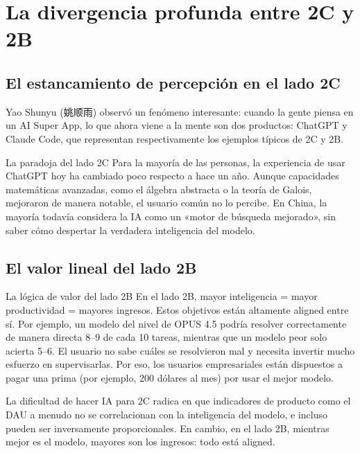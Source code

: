 \section{La divergencia profunda entre 2C y 2B}

\subsection{El estancamiento de percepción en el lado 2C}

Yao Shunyu (姚顺雨) observó un fenómeno interesante: cuando la gente piensa en un AI Super App, lo que ahora viene a la mente son dos productos: ChatGPT y Claude Code, que representan respectivamente los ejemplos típicos de 2C y 2B.

\begin{warningbox}{La paradoja del lado 2C}
Para la mayoría de las personas, la experiencia de usar ChatGPT hoy ha cambiado poco respecto a hace un año. Aunque capacidades matemáticas avanzadas, como el álgebra abstracta o la teoría de Galois, mejoraron de manera notable, el usuario común no lo percibe. En China, la mayoría todavía considera la IA como un «motor de búsqueda mejorado», sin saber cómo despertar la verdadera inteligencia del modelo.
\end{warningbox}

\subsection{El valor lineal del lado 2B}

\begin{importantbox}{La lógica de valor del lado 2B}
En el lado 2B, mayor inteligencia = mayor productividad = mayores ingresos. Estos objetivos están altamente aligned entre sí. Por ejemplo, un modelo del nivel de OPUS 4.5 podría resolver correctamente de manera directa 8--9 de cada 10 tareas, mientras que un modelo peor solo acierta 5--6. El usuario no sabe cuáles se resolvieron mal y necesita invertir mucho esfuerzo en supervisarlas. Por eso, los usuarios empresariales están dispuestos a pagar una prima (por ejemplo, 200 dólares al mes) por usar el mejor modelo.
\end{importantbox}

La dificultad de hacer IA para 2C radica en que indicadores de producto como el DAU a menudo no se correlacionan con la inteligencia del modelo, e incluso pueden ser inversamente proporcionales. En cambio, en el lado 2B, mientras mejor es el modelo, mayores son los ingresos: todo está aligned.

